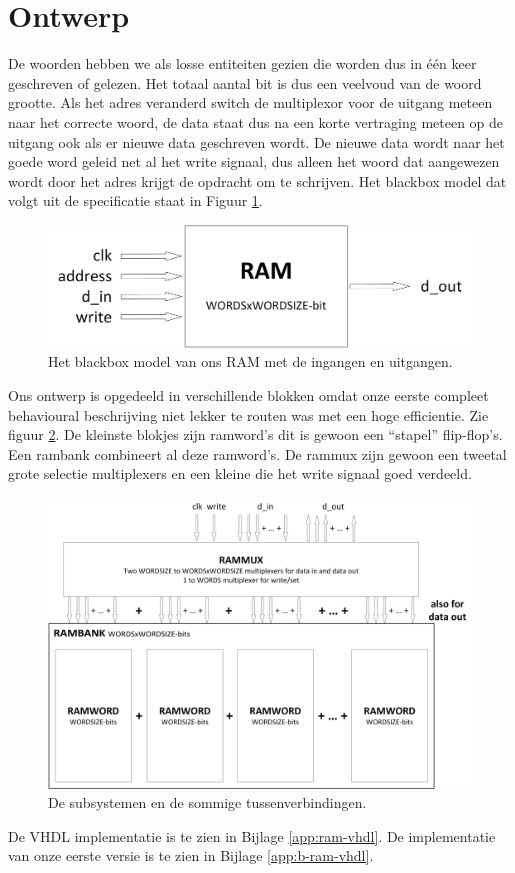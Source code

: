 \documentclass{article}
\begin{document}
\section{Ontwerp}
De woorden hebben we als losse entiteiten gezien die worden dus in één keer geschreven of gelezen.
Het totaal aantal bit is dus een veelvoud van de woord grootte.
Als het adres veranderd switch de multiplexor voor de uitgang meteen naar het correcte woord, de data staat dus na een korte vertraging meteen op de uitgang ook als er nieuwe data geschreven wordt.
De nieuwe data wordt naar het goede word geleid net al het write signaal, dus alleen het woord dat aangewezen wordt door het adres krijgt de opdracht om te schrijven.
Het blackbox model dat volgt uit de specificatie staat in Figuur \ref{fig:blackbox-ram}.
\begin{figure}[H]
\centering
		\includegraphics[width=\textwidth]{resource/blackbox-ram}
		\caption{Het blackbox model van ons RAM met de ingangen en uitgangen.}
		\label{fig:blackbox-ram}
\end{figure}
Ons ontwerp is opgedeeld in verschillende blokken omdat onze eerste compleet behavioural beschrijving niet lekker te routen was met een hoge efficientie. Zie figuur \ref{fig:subsystems-ram}.
De kleinste blokjes zijn ramword’s dit is gewoon een “stapel” flip-flop’s.
Een rambank combineert al deze ramword’s.
De rammux zijn gewoon een tweetal grote selectie multiplexers en een kleine die het write signaal goed verdeeld.
\begin{figure}[H]
\centering
		\includegraphics[width=\textwidth]{resource/subsystems-ram}
		\caption{De subsystemen en de sommige tussenverbindingen.}
		\label{fig:subsystems-ram}
\end{figure}
De VHDL implementatie is te zien in Bijlage \ref{app:ram-vhdl}. De implementatie van onze eerste versie is te zien in Bijlage \ref{app:b-ram-vhdl}.
\end{document}
